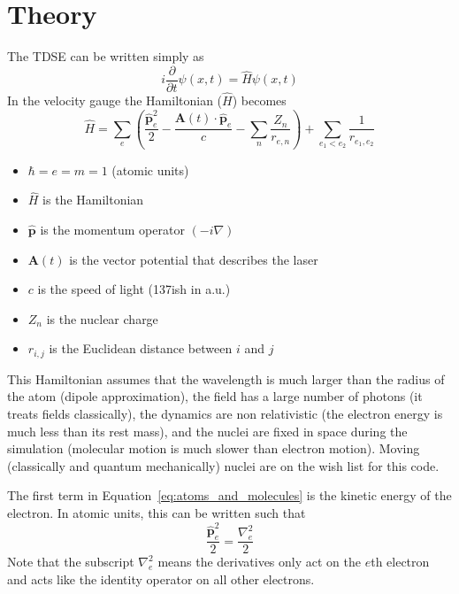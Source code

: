 \documentclass{article}
\begin{document}


\section{Theory} %
\label{sec:theory}

The TDSE can be written simply as
\begin{equation}
    i\frac{\partial}{\partial t}\psi(x,t) = \hat{H}\psi(x,t)
\end{equation}
In the velocity gauge the Hamiltonian ($\hat{H}$) becomes
\begin{equation}
    \label{eq:atoms_and_molecules}
    \hat{H} = \sum_{e}\left(\frac{\hat{\mathbf{p}}^2_e}{2} - \frac{\mathbf{A}(t) \cdot \hat{\mathbf{p}}_e}{c} - \sum_{n} \frac{Z_n}{r_{e,n}}\right) + \sum_{e_1 < e_2}\frac{1}{r_{e_1, e_2}}
\end{equation}
\begin{itemize}
    \item $\hbar=e=m=1$ (atomic units)
    \item $\hat{H}$ is the Hamiltonian
    \item $\hat{\mathbf{p}}$ is the momentum operator $(-i\nabla)$
    \item $\mathbf{A}(t)$ is the vector potential that describes the laser
    \item $c$ is the speed of light (137ish in a.u.)
    \item $Z_n$ is the nuclear charge
    \item $r_{i,j}$ is the Euclidean distance between $i$ and $j$
\end{itemize}
This Hamiltonian assumes that the wavelength is much larger than the radius of the atom (dipole approximation), the field has a large number of photons (it treats fields classically), the dynamics are non relativistic (the electron energy is much less than its rest mass), and the nuclei are fixed in space during the simulation (molecular motion is much slower than electron motion). Moving (classically and quantum mechanically) nuclei are on the wish list for this code.

The first term in Equation~\ref{eq:atoms_and_molecules} is the kinetic energy of the electron. In atomic units, this can be written such that
\begin{equation}
  \frac{\hat{\mathbf{p}}^2_e}{2} = \frac{\nabla_e^2}{2}
\end{equation}
Note that the subscript $\nabla_e^2$ means the derivatives only act on the $e$th electron and acts like the identity operator on all other electrons.
\end{document}

